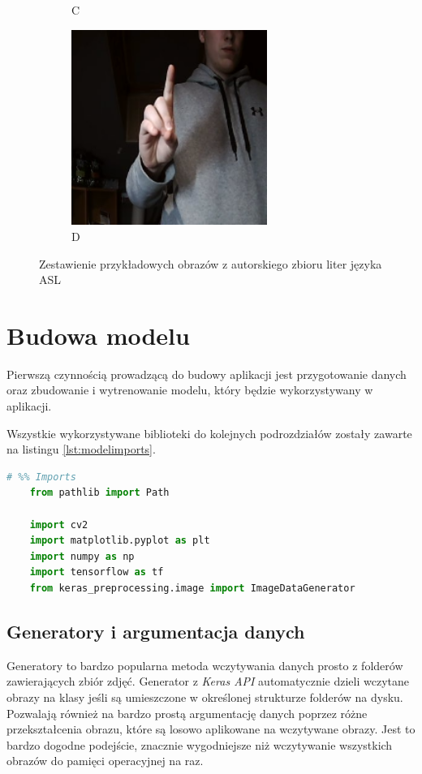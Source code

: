 \documentclass[a4paper,12pt,oneside]{book} %
\begin{document}
\begin{figure}[h]
\begin{subfigure}{0.4\textwidth}
			\caption{C}
		\end{subfigure}
		\begin{subfigure}{0.4\textwidth}
			\centering
			\includegraphics[width=0.7\textwidth]{asl_d.png}
			\caption{D}
		\end{subfigure}
	\caption{Zestawienie przykładowych obrazów z autorskiego zbioru liter języka ASL}
	\label{asl_own_photos}
\end{figure}

\section{Budowa modelu}

Pierwszą czynnością prowadzącą do budowy aplikacji jest przygotowanie danych oraz zbudowanie i wytrenowanie modelu, który będzie wykorzystywany w aplikacji.

Wszystkie wykorzystywane biblioteki do kolejnych podrozdziałów zostały zawarte na listingu \ref{lst:modelimports}.

\begin{lstlisting}[language=Python, caption={Importowane biblioteki}, label={lst:modelimports}]
	# %% Imports
	from pathlib import Path
	
	import cv2
	import matplotlib.pyplot as plt
	import numpy as np
	import tensorflow as tf
	from keras_preprocessing.image import ImageDataGenerator
\end{lstlisting}

\subsection{Generatory i argumentacja danych}
Generatory to bardzo popularna metoda wczytywania danych prosto z folderów zawierających zbiór zdjęć. Generator z \emph{Keras API} automatycznie dzieli wczytane obrazy na klasy jeśli są umieszczone w określonej strukturze folderów na dysku. Pozwalają również na bardzo prostą argumentację danych poprzez różne przekształcenia obrazu, które są losowo aplikowane na wczytywane obrazy. Jest to bardzo dogodne podejście, znacznie wygodniejsze niż wczytywanie wszystkich obrazów do pamięci operacyjnej na raz.
\end{document}
